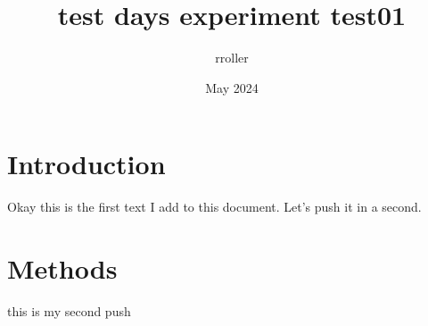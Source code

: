 \documentclass{article}
\title{test days experiment test01}
\author{rroller }
\date{May 2024}
\begin{document}
\maketitle

\section{Introduction}
Okay this is the first text I add to this document. Let's push it in a second.


\section{Methods}
this is my second push
\end{document}
